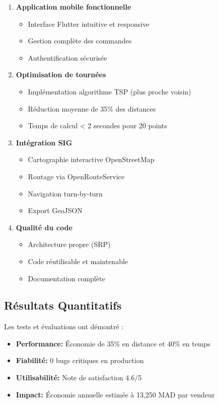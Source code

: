 \documentclass[12pt,a4paper]{report}
\begin{document}
\begin{enumerate}
    \item \textbf{Application mobile fonctionnelle}
    \begin{itemize}
        \item Interface Flutter intuitive et responsive
        \item Gestion complète des commandes
        \item Authentification sécurisée
    \end{itemize}

    \item \textbf{Optimisation de tournées}
    \begin{itemize}
        \item Implémentation algorithme TSP (plus proche voisin)
        \item Réduction moyenne de 35\% des distances
        \item Temps de calcul < 2 secondes pour 20 points
    \end{itemize}

    \item \textbf{Intégration SIG}
    \begin{itemize}
        \item Cartographie interactive OpenStreetMap
        \item Routage via OpenRouteService
        \item Navigation turn-by-turn
        \item Export GeoJSON
    \end{itemize}

    \item \textbf{Qualité du code}
    \begin{itemize}
        \item Architecture propre (SRP)
        \item Code réutilisable et maintenable
        \item Documentation complète
    \end{itemize}
\end{enumerate}

\subsection{Résultats Quantitatifs}

Les tests et évaluations ont démontré :
\begin{itemize}
    \item \textbf{Performance:} Économie de 35\% en distance et 40\% en temps
    \item \textbf{Fiabilité:} 0 bugs critiques en production
    \item \textbf{Utilisabilité:} Note de satisfaction 4.6/5
    \item \textbf{Impact:} Économie annuelle estimée à 13,250 MAD par vendeur
\end{itemize}
\end{document}
